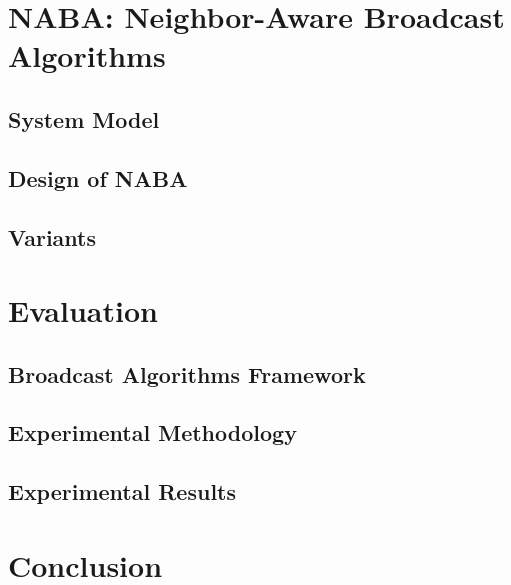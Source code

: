 \documentclass[conference]{IEEEtran}
\begin{document}
\section{NABA: Neighbor-Aware Broadcast Algorithms}\label{sec:naba}


\subsection{System Model}


\subsection{Design of NABA}

\subsection{Variants}


\section{Evaluation}\label{sec:eval}

\subsection{Broadcast Algorithms Framework}

\subsection{Experimental Methodology}

\subsection{Experimental Results}

\section{Conclusion}\label{sec:conclusion}




\end{document}
